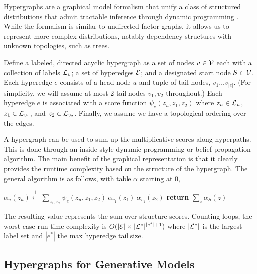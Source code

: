 \documentclass{article}
\begin{document}
Hypergraphs are a graphical model formalism that
unify a class of structured distributions that admit tractable
inference through dynamic programming \citep{klein2004parsing,huang2005better,zhou2006learning,javidian2020hypergraph,chiang2020factor}. While the formalism is similar to undirected factor graphs,
it allows us to represent more complex distributions, notably
dependency structures with unknown topologies, such as trees.

Define a labeled, directed acyclic hypergraph as a set of nodes
$v \in \cal V$ each with a collection of labels ${\cal L}_v$; a set of
hyperedges $\cal E$; and a designated start node $S \in {\cal V}$. Each
hyperedge $e$ consists of a head node $u$ and tuple of tail nodes,
 $v_1 \ldots v_{|e|}$. (For simplicity, we will assume at most 2 tail nodes $v_1, v_2$ throughout.) Each hyperedge $e$
is associated with a score function $\psi_{e}(z_u, z_{1}, z_{2})$ where $z_u\in \mathcal{L}_u$, $z_{1} \in {\cal L}_{v_1}$,  and $z_{2} \in {\cal L}_{v_2}$. Finally, we assume we have a topological ordering over the edges.

A hypergraph can be used to sum up the multiplicative scores along hyperpaths. This is done through an inside-style dynamic programming or belief
propagation algorithm. The main benefit of the graphical representation is that it clearly provides the runtime complexity based on the structure of the hypergraph. The general algorithm is as follows, with table $\alpha$ starting at 0, 
\begin{algorithm}
\begin{algorithmic} 
\STATE $\alpha_u(z_u) \stackrel{+}{\gets}  \displaystyle \sum_{z_1, z_2}  \psi_e(z_u, z_1, z_2) \  \alpha_{v_1}(z_1) \  \alpha_{v_1}(z_2)$
\ENDFOR
\ENDFOR
\STATE \textbf{return} $\sum_z \alpha_S(z)$
\end{algorithmic} 
\end{algorithm}

The resulting value represents the sum over structure scores. Counting
loops, the worst-case run-time complexity is
$O(|{\cal E}|\times |{\cal L}^*|^{|e^*|+1})$ where $|{\cal L}^*|$ is the 
largest label set and $|e^*|$ the max hyperedge tail size.

\subsection{Hypergraphs for Generative Models}
\end{document}
